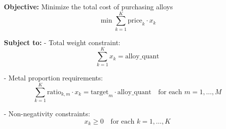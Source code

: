 \documentclass{article}
\begin{document}
\textbf{Objective:} Minimize the total cost of purchasing alloys
\[
\min \sum_{k=1}^{K} \text{price}_k \cdot x_k
\]

\textbf{Subject to:}
- Total weight constraint:
\[
\sum_{k=1}^{K} x_k = \text{alloy\_quant}
\]

- Metal proportion requirements:
\[
\sum_{k=1}^{K} \text{ratio}_{k,m} \cdot x_k = \text{target}_m \cdot \text{alloy\_quant} \quad \text{for each } m = 1, \ldots, M
\]

- Non-negativity constraints:
\[
x_k \geq 0 \quad \text{for each } k = 1, \ldots, K
\]
\end{document}
